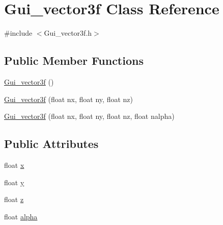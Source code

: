 \hypertarget{class_gui__vector3f}{\section{Gui\-\_\-vector3f Class Reference}
\label{class_gui__vector3f}
}


{\ttfamily \#include $<$Gui\-\_\-vector3f.\-h$>$}

\subsection*{Public Member Functions}
\begin{DoxyCompactItemize}
\item 
\hyperlink{class_gui__vector3f_a36f8a218666fe4c979b35d4c3c0191dc}{Gui\-\_\-vector3f} ()
\item 
\hyperlink{class_gui__vector3f_a9fcb1b9661c69b06d2be77a162322ee5}{Gui\-\_\-vector3f} (float nx, float ny, float nz)
\item 
\hyperlink{class_gui__vector3f_a298abf0fa1f67166f706a1b6f445b9b4}{Gui\-\_\-vector3f} (float nx, float ny, float nz, float nalpha)
\end{DoxyCompactItemize}
\subsection*{Public Attributes}
\begin{DoxyCompactItemize}
\item 
float \hyperlink{class_gui__vector3f_a023856935269d19fbe9e4e2405c4a330}{x}
\item 
float \hyperlink{class_gui__vector3f_aeeb2c025e216e05450ccc0516a31339c}{y}
\item 
float \hyperlink{class_gui__vector3f_a36f4373054963a96e658d27b00ccc281}{z}
\item 
float \hyperlink{class_gui__vector3f_af93c521b147e54d6b50f6612927e5d90}{alpha}
\end{DoxyCompactItemize}


